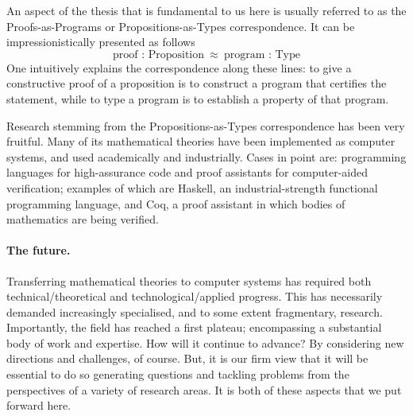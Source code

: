 \documentclass[11pt,twocolumn]{article}
\newenvironment{myitemize}
  {\begin{list}{$\bullet$}
  {\setlength{\topsep}{1pt}
   \setlength{\partopsep}{1pt}
   \setlength{\itemsep}{0pt}
   \setlength{\parsep}{0pt}
   \setlength{\leftmargin}{1em}
   \setlength{\labelwidth}{.5em}}}
  {\end{list}}
\newcommand{\eg}{\emph{eg.}}
\begin{document}
An aspect of the thesis that is fundamental to us here is usually referred
to as the Proofs-as-Programs or Propositions-as-Types correspondence.
It can be impressionistically %
presented %
as follows
\[%
%
  \mbox{proof : Proposition} 
  \enspace \approx \enspace 
  \mbox{program : Type} 
\]
One %
intuitively explains the correspondence along these lines: %
  to give a constructive proof of a proposition 
  is to construct a program that certifies the statement, 
  while
  to type a program is to establish a property of that program.

Research stemming from the Propositions-as-Types correspondence has been
very fruitful.  Many of its mathematical theories have been implemented as
computer systems, and used academically and industrially.  Cases in point
are: programming languages for high-assurance code and proof assistants
for computer-aided verification; examples of which are
Haskell, %
an industrial-strength functional programming language, 
and Coq, %
a proof assistant in which bodies of mathematics are being verified.

\paragraph*{The future.}

Transferring mathematical theories to computer
systems has required both technical/theoretical and technological/applied
progress.  This has necessarily demanded increasingly specialised, and to
some extent fragmentary, research.  
Importantly, %
the field has reached a first plateau; encompassing a substantial body of
work and expertise.  
How %
will it continue to advance?  
By considering new directions and challenges, of course.  
But, 
it is our firm view that %
it will be essential to do so generating questions and tackling problems
from the perspectives of a variety of research areas.  
It is both of these aspects that we put forward here.
\end{document}
